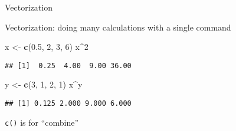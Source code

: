 \documentclass[ignorenonframetext,]{beamer}
\newenvironment{Shaded}{\begin{snugshade}}{\end{snugshade}}
\newcommand{\DecValTok}[1]{\textcolor[rgb]{0.00,0.00,0.81}{#1}}
\newcommand{\FloatTok}[1]{\textcolor[rgb]{0.00,0.00,0.81}{#1}}
\newcommand{\KeywordTok}[1]{\textcolor[rgb]{0.13,0.29,0.53}{\textbf{#1}}}
\newcommand{\NormalTok}[1]{#1}
\newcommand{\OperatorTok}[1]{\textcolor[rgb]{0.81,0.36,0.00}{\textbf{#1}}}
\newcommand{\StringTok}[1]{\textcolor[rgb]{0.31,0.60,0.02}{#1}}
\begin{document}
\begin{frame}[fragile]{Vectorization}
\protect\hypertarget{vectorization}{}

Vectorization: doing many calculations with a single command

\begin{Shaded}
\begin{Highlighting}[]
\NormalTok{x <-}\StringTok{ }\KeywordTok{c}\NormalTok{(}\FloatTok{0.5}\NormalTok{, }\DecValTok{2}\NormalTok{, }\DecValTok{3}\NormalTok{, }\DecValTok{6}\NormalTok{)}
\NormalTok{x}\OperatorTok{^}\DecValTok{2}
\end{Highlighting}
\end{Shaded}

\begin{verbatim}
## [1]  0.25  4.00  9.00 36.00
\end{verbatim}

\begin{Shaded}
\begin{Highlighting}[]
\NormalTok{y <-}\StringTok{ }\KeywordTok{c}\NormalTok{(}\DecValTok{3}\NormalTok{, }\DecValTok{1}\NormalTok{, }\DecValTok{2}\NormalTok{, }\DecValTok{1}\NormalTok{)}
\NormalTok{x}\OperatorTok{^}\NormalTok{y}
\end{Highlighting}
\end{Shaded}

\begin{verbatim}
## [1] 0.125 2.000 9.000 6.000
\end{verbatim}

\texttt{c()} is for ``combine''

\end{frame}
\end{document}
